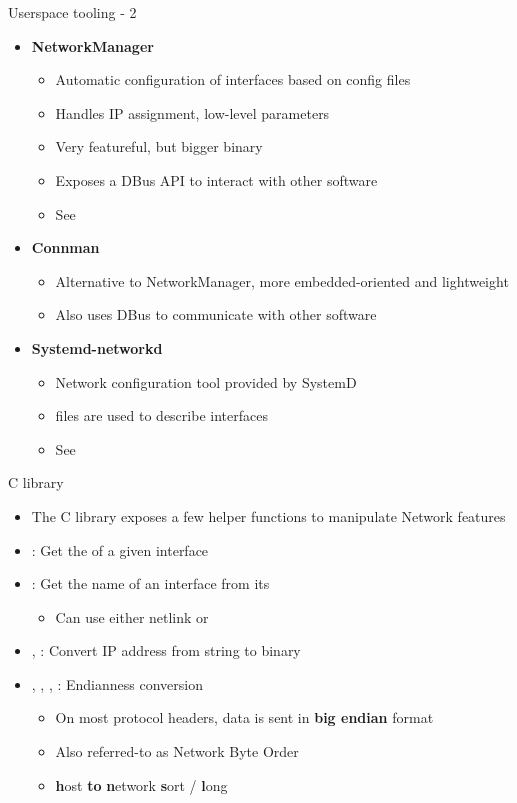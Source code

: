 \begin{frame}{Userspace tooling - 2}
	\begin{itemize}
		\item \textbf{NetworkManager}
			\begin{itemize}
				\item Automatic configuration of interfaces based on config files
				\item Handles IP assignment, low-level parameters
				\item Very featureful, but bigger binary
				\item Exposes a DBus API to interact with other software
				\item See 
			\end{itemize}
		\item \textbf{Connman}
			\begin{itemize}
				\item Alternative to NetworkManager, more embedded-oriented and lightweight
				\item Also uses DBus to communicate with other software
			\end{itemize}
		\item \textbf{Systemd-networkd}
			\begin{itemize}
				\item Network configuration tool provided by SystemD 
				\item {} files are used to describe interfaces
				\item See 
			\end{itemize}
		\end{itemize}
\end{frame}

\begin{frame}{C library}
	\begin{itemize}
		\item The C library exposes a few helper functions to manipulate Network features
		\item {}: Get the  of a given interface
		\item {}: Get the name of an interface from its 
			\begin{itemize}
				\item Can use either netlink or 
			\end{itemize}
		\item {}, : Convert IP address from string to binary
		\item {}, , , : Endianness conversion
			\begin{itemize}
				\item On most protocol headers, data is sent in \textbf{big endian} format
				\item Also referred-to as Network Byte Order
				\item \textbf{h}ost \textbf{to} \textbf{n}etwork \textbf{s}ort / \textbf{l}ong
			\end{itemize}
	\end{itemize}
\end{frame}




